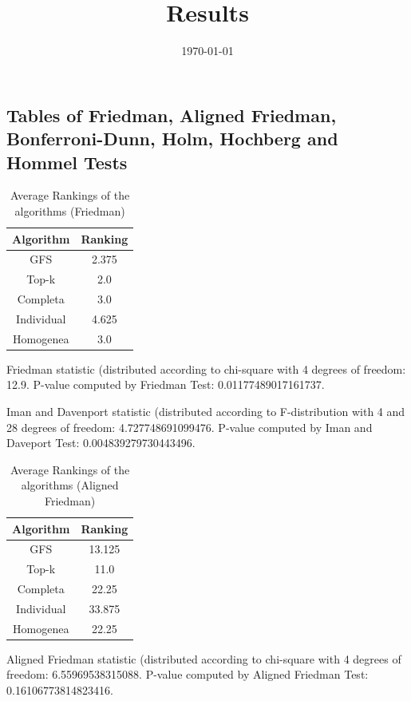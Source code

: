\documentclass[a4paper,10pt]{article}
\title{Results}
\author{}
\date{\today}
\begin{document}
\begin{landscape}
\oddsidemargin 0in \topmargin 0in\maketitle
\section{Tables of Friedman, Aligned Friedman, Bonferroni-Dunn, Holm, Hochberg and Hommel Tests}
\begin{table}[!htp]
\centering
\caption{Average Rankings of the algorithms (Friedman)
}\begin{tabular}{c|c}
Algorithm&Ranking\\
\hline
GFS&2.375\\
Top-k&2.0\\
Completa&3.0\\
Individual&4.625\\
Homogenea&3.0\\
\end{tabular}
\end{table}


Friedman statistic (distributed according to chi-square with 4 degrees of freedom: 12.9. 
P-value computed by Friedman Test: 0.01177489017161737.\newline

Iman and Davenport statistic (distributed according to F-distribution with 4 and 28 degrees of freedom: 4.727748691099476. 
P-value computed by Iman and Daveport Test: 0.004839279730443496.\newline


\newpage

\begin{table}[!htp]
\centering
\caption{Average Rankings of the algorithms (Aligned Friedman)
}\begin{tabular}{c|c}
Algorithm&Ranking\\
\hline
GFS&13.125\\
Top-k&11.0\\
Completa&22.25\\
Individual&33.875\\
Homogenea&22.25\\
\end{tabular}
\end{table}


Aligned Friedman statistic (distributed according to chi-square with 4 degrees of freedom: 6.55969538315088. 
P-value computed by Aligned Friedman Test: 0.16106773814823416.\newline



\end{landscape}
\end{document}
